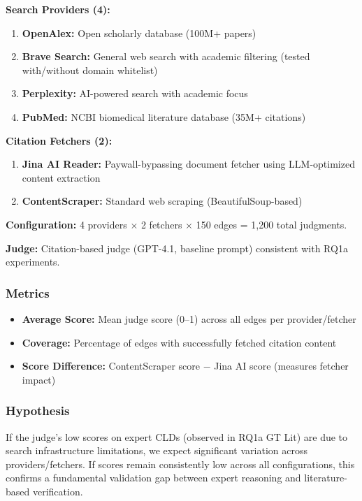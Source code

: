 \textbf{Search Providers (4):}
\begin{enumerate}[noitemsep]
    \item \textbf{OpenAlex:} Open scholarly database (100M+ papers)
    \item \textbf{Brave Search:} General web search with academic filtering (tested with/without domain whitelist)
    \item \textbf{Perplexity:} AI-powered search with academic focus
    \item \textbf{PubMed:} NCBI biomedical literature database (35M+ citations)
\end{enumerate}

\textbf{Citation Fetchers (2):}
\begin{enumerate}[noitemsep]
    \item \textbf{Jina AI Reader:} Paywall-bypassing document fetcher using LLM-optimized content extraction
    \item \textbf{ContentScraper:} Standard web scraping (BeautifulSoup-based)
\end{enumerate}

\textbf{Configuration:} 4 providers $\times$ 2 fetchers $\times$ 150 edges = 1,200 total judgments.

\textbf{Judge:} Citation-based judge (GPT-4.1, baseline prompt) consistent with RQ1a experiments.

\subsubsection{Metrics}

\begin{itemize}[noitemsep]
    \item \textbf{Average Score:} Mean judge score (0--1) across all edges per provider/fetcher
    \item \textbf{Coverage:} Percentage of edges with successfully fetched citation content
    \item \textbf{Score Difference:} ContentScraper score $-$ Jina AI score (measures fetcher impact)
\end{itemize}

\subsubsection{Hypothesis}

If the judge's low scores on expert CLDs (observed in RQ1a GT Lit) are due to search infrastructure limitations, we expect significant variation across providers/fetchers. If scores remain consistently low across all configurations, this confirms a fundamental validation gap between expert reasoning and literature-based verification.

